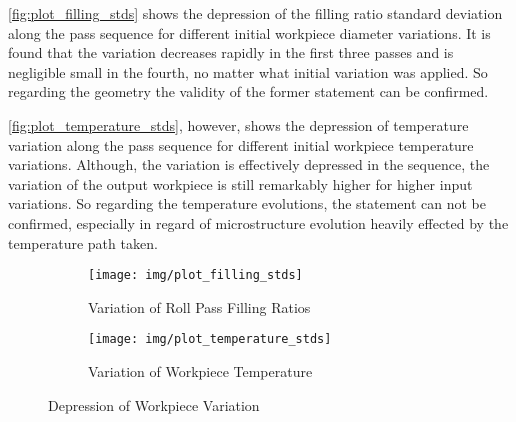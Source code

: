 \autoref{fig:plot_filling_stds} shows the depression of the filling ratio standard deviation along the pass sequence for different initial workpiece diameter variations.
It is found that the variation decreases rapidly in the first three passes and is negligible small in the fourth, no matter what initial variation was applied.
So regarding the geometry the validity of the former statement can be confirmed.

\autoref{fig:plot_temperature_stds}, however, shows the depression of temperature variation along the pass sequence for different initial workpiece temperature variations.
Although, the variation is effectively depressed in the sequence, the variation of the output workpiece is still remarkably higher for higher input variations.
So regarding the temperature evolutions, the statement can not be confirmed, especially in regard of microstructure evolution heavily effected by the temperature path taken.

\begin{figure}
    \begin{subfigure}{\linewidth}
        \centering
        \texttt{[image: img/plot\_filling\_stds]}
        \caption{Variation of Roll Pass Filling Ratios}
        \label{fig:plot_filling_stds}
    \end{subfigure}
    \begin{subfigure}{\linewidth}
        \centering
        \texttt{[image: img/plot\_temperature\_stds]}
        \caption{Variation of Workpiece Temperature}
        \label{fig:plot_temperature_stds}
    \end{subfigure}
    \caption{Depression of Workpiece Variation}
\end{figure}

